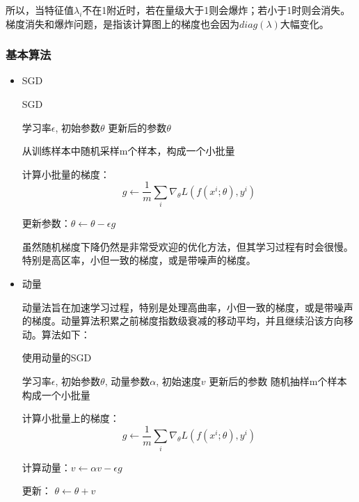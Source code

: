 所以，当特征值$\lambda_i$不在1附近时，若在量级大于1则会爆炸；若小于1时则会消失。梯度消失和爆炸问题，是指该计算图上的梯度也会因为$diag(\lambda)$大幅变化。

\subsubsection{基本算法}

\begin{itemize}
\item SGD

\begin{algorithm}
\caption{SGD}
\begin{algorithmic}[1]
\Require 学习率$\epsilon$, 初始参数$\theta$
\Ensure 更新后的参数$\theta$
\Repeat

	从训练样本中随机采样m个样本，构成一个小批量
	
	计算小批量的梯度：
	\begin{displaymath}
	g \leftarrow \frac{1}{m} \sum_{i}\nabla_{\theta}L(f(x^{i}; \theta), y^{i})
	\end{displaymath}
	
	更新参数：$\theta \leftarrow \theta - \epsilon g$
\end{algorithmic}
\end{algorithm}

虽然随机梯度下降仍然是非常受欢迎的优化方法，但其学习过程有时会很慢。特别是高区率，小但一致的梯度，或是带噪声的梯度。

\item 动量

动量法旨在加速学习过程，特别是处理高曲率，小但一致的梯度，或是带噪声的梯度。动量算法积累之前梯度指数级衰减的移动平均，并且继续沿该方向移动。算法如下：
\begin{algorithm}
\caption{使用动量的SGD}
\begin{algorithmic}
\Require 学习率$\epsilon$, 初始参数$\theta$, 动量参数$\alpha$, 初始速度$v$
\Ensure 更新后的参数
\Repeat
	随机抽样m个样本构成一个小批量
	
	计算小批量上的梯度：
	\begin{displaymath}
		g \leftarrow \frac{1}{m} \sum_{i}\nabla_{\theta}L(f(x^{i}; \theta), y^{i})
	\end{displaymath}
		
	计算动量：$v \leftarrow \alpha v - \epsilon g$
	
	更新： $\theta \leftarrow \theta + v$	
	
\end{algorithmic}
\end{algorithm}


\end{itemize}
